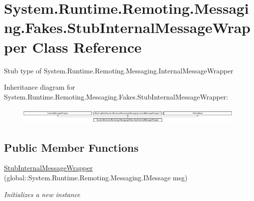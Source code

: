 \hypertarget{class_system_1_1_runtime_1_1_remoting_1_1_messaging_1_1_fakes_1_1_stub_internal_message_wrapper}{\section{System.\-Runtime.\-Remoting.\-Messaging.\-Fakes.\-Stub\-Internal\-Message\-Wrapper Class Reference}
\label{class_system_1_1_runtime_1_1_remoting_1_1_messaging_1_1_fakes_1_1_stub_internal_message_wrapper}
}


Stub type of System.\-Runtime.\-Remoting.\-Messaging.\-Internal\-Message\-Wrapper 


Inheritance diagram for System.\-Runtime.\-Remoting.\-Messaging.\-Fakes.\-Stub\-Internal\-Message\-Wrapper\-:\begin{figure}[H]
\begin{center}
\leavevmode
\includegraphics[height=0.804598cm]{class_system_1_1_runtime_1_1_remoting_1_1_messaging_1_1_fakes_1_1_stub_internal_message_wrapper}
\end{center}
\end{figure}
\subsection*{Public Member Functions}
\begin{DoxyCompactItemize}
\item 
\hyperlink{class_system_1_1_runtime_1_1_remoting_1_1_messaging_1_1_fakes_1_1_stub_internal_message_wrapper_aacbe258a54601a9d78bd3898e41b2a45}{Stub\-Internal\-Message\-Wrapper} (global\-::\-System.\-Runtime.\-Remoting.\-Messaging.\-I\-Message msg)
\begin{DoxyCompactList}\small\item\em Initializes a new instance\end{DoxyCompactList}\end{DoxyCompactItemize}
